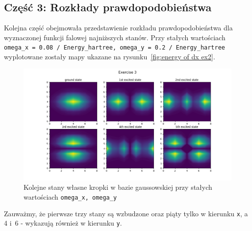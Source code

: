 \documentclass{article}
\begin{document}
\subsection{Część 3: Rozkłady prawdopodobieństwa}
Kolejna część obejmowała przedstawienie rozkładu prawdopodobieństwa dla wyznaczonej funkcji falowej najniższych stanów.
Przy stałych wartościach \texttt{omega\_x = 0.08 / Energy\_hartree, omega\_y = 0.2 / Energy\_hartree} wyplotowane zostały mapy ukazane na rysunku~\ref{fig:energy of dx ex2}.
\begin{figure}[htp!]
    \centering
    \includegraphics[width=0.75\linewidth]{exercise3.png}
    \caption{Kolejne stany własne kropki w bazie gaussowskiej przy stałych wartościach \texttt{omega\_x, omega\_y}}
    \label{fig:states ex3}
\end{figure}
Zauważmy, że pierwsze trzy stany są wzbudzone oraz piąty tylko w kierunku \texttt{x}, a 4 i~6 - wykazują również w kierunku \texttt{y}.
\end{document}
